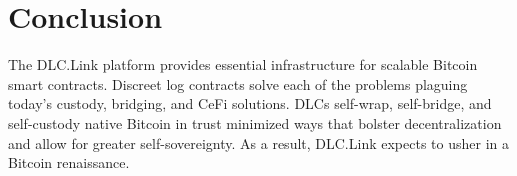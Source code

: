 \documentclass[twoside, a4paper, 11pt]{article}
\begin{document}
  \section{Conclusion}

  The DLC.Link platform provides essential infrastructure for scalable Bitcoin smart contracts. Discreet log contracts solve each of the problems plaguing today’s custody, bridging, and CeFi solutions. DLCs self-wrap, self-bridge, and self-custody native Bitcoin in trust minimized ways that bolster decentralization and allow for greater self-sovereignty. As a result, DLC.Link expects to usher in a Bitcoin renaissance.
\end{document}

